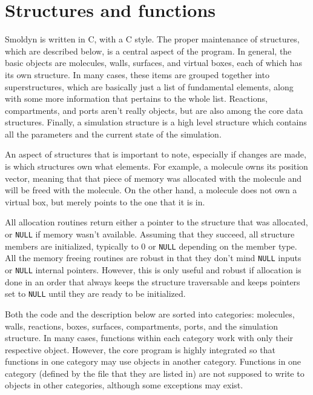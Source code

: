 \documentclass {book}
\begin{document}
\chapter{Structures and functions}

Smoldyn is written in C, with a C style.  The proper maintenance of structures, which are described below, is a central aspect of the program.  In general, the basic objects are molecules, walls, surfaces, and virtual boxes, each of which has its own structure.  In many cases, these items are grouped together into superstructures, which are basically just a list of fundamental elements, along with some more information that pertains to the whole list.  Reactions, compartments, and ports aren't really objects, but are also among the core data structures.  Finally, a simulation structure is a high level structure which contains all the parameters and the current state of the simulation.

An aspect of structures that is important to note, especially if changes are made, is which structures own what elements.  For example, a molecule owns its position vector, meaning that that piece of memory was allocated with the molecule and will be freed with the molecule.  On the other hand, a molecule does not own a virtual box, but merely points to the one that it is in.

All allocation routines return either a pointer to the structure that was allocated, or \texttt{NULL} if memory wasn't available.  Assuming that they succeed, all structure members are initialized, typically to 0 or \texttt{NULL} depending on the member type.  All the memory freeing routines are robust in that they don't mind \texttt{NULL} inputs or \texttt{NULL} internal pointers.  However, this is only useful and robust if allocation is done in an order that always keeps the structure traversable and keeps pointers set to \texttt{NULL} until they are ready to be initialized.

Both the code and the description below are sorted into categories: molecules, walls, reactions, boxes, surfaces, compartments, ports, and the simulation structure.  In many cases, functions within each category work with only their respective object.  However, the core program is highly integrated so that functions in one category may use objects in another category.  Functions in one category (defined by the file that they are listed in) are not supposed to write to objects in other categories, although some exceptions may exist.

\end{document}
